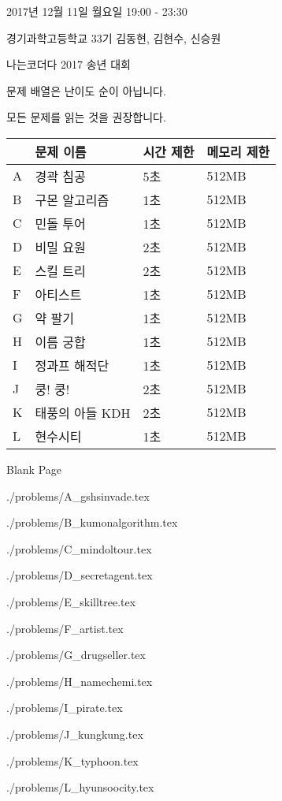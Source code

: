 \documentclass[12pt,a4paper,oneside]{article}
\newcommand{\importproblem}[1]{{./problems/#1.tex}}
\begin{document}
\begin{titlepage}
	\centering
	{2017년 12월 11일 월요일 19:00 - 23:30\par}
	{경기과학고등학교 33기 김동현, 김현수, 신승원\par}
	\vspace{2cm}
	{\huge 나는코더다 2017 송년 대회 \par}
	\vspace{3cm}
	{\Large 문제 배열은 난이도 순이 아닙니다.\par}
	{\Large 모든 문제를 읽는 것을 권장합니다.\par}
	\vspace{3cm}
	\begin{table}[h]
		\centering
		\renewcommand{\arraystretch}{1.2}
		\begin{tabular}{|l|M{5cm}|M{2cm}|M{2.5cm}|}
			\hline
			& 문제 이름 & 시간 제한 & 메모리 제한 \\ \hline
			A & 경곽 침공 & 5초 & 512MB \\ \hline
			B & 구몬 알고리즘 & 1초 & 512MB \\ \hline
			C & 민돌 투어 & 1초 & 512MB \\ \hline
			D & 비밀 요원 & 2초 & 512MB \\ \hline
			E & 스킬 트리 & 2초 & 512MB \\ \hline
			F & 아티스트 & 1초 & 512MB \\ \hline
			G & 약 팔기 & 1초 & 512MB \\ \hline
			H & 이름 궁합 & 1초 & 512MB \\ \hline
			I & 정과프 해적단 & 1초 & 512MB \\ \hline
			J & 쿵! 쿵! & 2초 & 512MB \\ \hline
			K & 태풍의 아들 KDH & 2초 & 512MB \\ \hline
			L & 현수시티 & 1초 & 512MB \\ \hline
		\end{tabular}
	\end{table}
	
  	\newpage
	\thispagestyle{empty}
	\hspace{0pt}
	\vfill
	\huge Blank Page
	\hspace{0pt}
	\vfill
	
\end{titlepage}

\raggedbottom

\importproblem{A_gshsinvade}

\importproblem{B_kumonalgorithm}

\importproblem{C_mindoltour}

\importproblem{D_secretagent}

\importproblem{E_skilltree}

\importproblem{F_artist}

\importproblem{G_drugseller}

\importproblem{H_namechemi}

\importproblem{I_pirate}

\importproblem{J_kungkung}

\importproblem{K_typhoon}

\importproblem{L_hyunsoocity}
\end{document}
